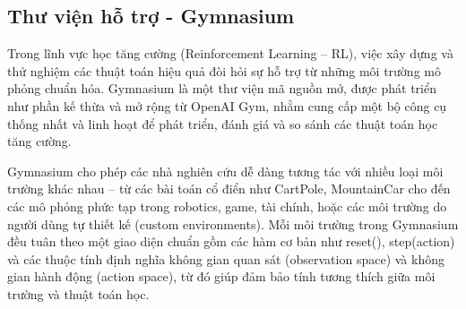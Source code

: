 \subsection{Thư viện hỗ trợ - Gymnasium}

Trong lĩnh vực học tăng cường (Reinforcement Learning – RL), việc xây dựng và thử nghiệm các thuật toán hiệu quả đòi hỏi sự hỗ trợ từ những môi trường mô phỏng chuẩn hóa. Gymnasium là một thư viện mã nguồn mở, được phát triển như phần kế thừa và mở rộng từ OpenAI Gym, nhằm cung cấp một bộ công cụ thống nhất và linh hoạt để phát triển, đánh giá và so sánh các thuật toán học tăng cường.

Gymnasium cho phép các nhà nghiên cứu dễ dàng tương tác với nhiều loại môi trường khác nhau – từ các bài toán cổ điển như CartPole, MountainCar cho đến các mô phỏng phức tạp trong robotics, game, tài chính, hoặc các môi trường do người dùng tự thiết kế (custom environments). Mỗi môi trường trong Gymnasium đều tuân theo một giao diện chuẩn gồm các hàm cơ bản như reset(), step(action) và các thuộc tính định nghĩa không gian quan sát (observation space) và không gian hành động (action space), từ đó giúp đảm bảo tính tương thích giữa môi trường và thuật toán học.